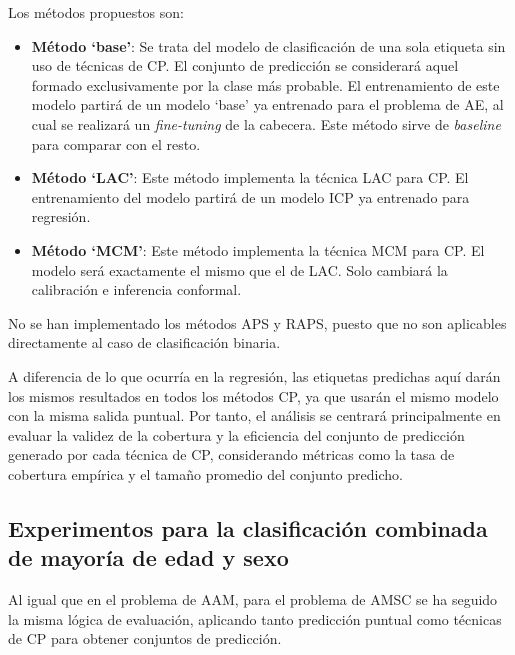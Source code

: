 Los métodos propuestos son:

\begin{itemize}

\item \textbf{Método `base'}: Se trata del modelo de clasificación de una sola etiqueta sin uso de técnicas de 
CP. El conjunto de predicción se considerará aquel formado exclusivamente por la clase más probable. 
El entrenamiento de este modelo partirá de un modelo `base' ya entrenado para el problema de AE, al cual se 
realizará un \textit{fine-tuning} de la cabecera.  
Este método sirve de \textit{baseline} para comparar con el resto. 

\item \textbf{Método `LAC'}: Este método implementa la técnica LAC para CP. 
El entrenamiento del modelo partirá de un modelo ICP ya entrenado para regresión.

\item \textbf{Método `MCM'}: Este método implementa la técnica MCM para CP. 
El modelo será exactamente el mismo que el de LAC. Solo cambiará la calibración e inferencia conformal. 

\end{itemize} 

No se han implementado los métodos APS y RAPS, puesto que no son aplicables directamente al caso de 
clasificación binaria.

A diferencia de lo que ocurría en la regresión, las etiquetas predichas aquí darán los mismos resultados en 
todos los métodos CP, ya que usarán el mismo modelo con la misma salida puntual. 
Por tanto, el análisis se centrará principalmente en evaluar la validez de la cobertura y la eficiencia del 
conjunto de predicción generado por cada técnica de CP, considerando métricas como la tasa de cobertura 
empírica y el tamaño promedio del conjunto predicho.



\subsection{Experimentos para la clasificación combinada de mayoría de edad y sexo}

Al igual que en el problema de AAM, para el problema de AMSC se ha seguido la misma lógica de evaluación, 
aplicando tanto predicción puntual como técnicas de CP para obtener conjuntos de predicción. 


